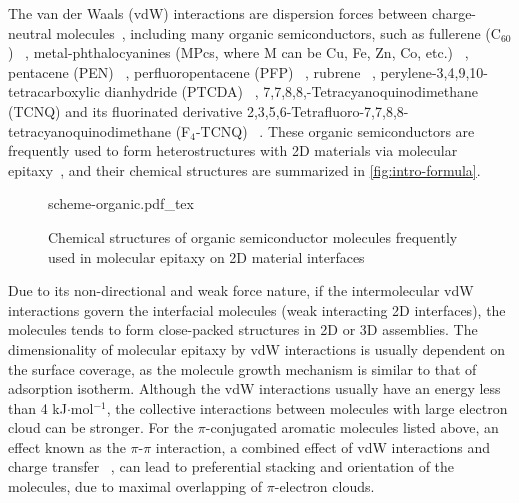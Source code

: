 The van der Waals (vdW) interactions are dispersion forces between
charge-neutral molecules~\cite{Israelachvili_2011_book}, including
many organic semiconductors, such as fullerene (C\(_{\text{60}}\))
~\cite{Corso_2004_C60_hBN,Kim_2015_c60_gr,Chen_2016_c60_mos2},
metal-phthalo\-cyanines (MPcs, where M can be Cu, Fe, Zn, Co, etc.)
~\cite{Xiao_2013_jacs_CuPc_gr,Wang_2010_selec_F16_gr,Zhang_2011_FePc_gr,Hamalainen_2012_CoPc_gr_Ir,Ying_Mao_2011_ge_clAlPc,Ogawa_2013_AlCiPc_gr,Pak_2015_CuPc_MoS2,Avvisati_2017_FePc_intercal,Iannuzzi_2014_MPc_hBN_Rh},
pentacene (PEN)
~\cite{Lee_2011_pentacene,Jariwala_2016_Mos2_pentacene,Shen_2017_DFT_mos2_pent,Kim_2016_trap_Mos2_pent,Nguyen_2015_pent_gr_wett,Betti_2007_orien_pentacene},
perfluoropentacene (PFP)
~\cite{Salzmann_2012_fpen_gr,Breuer_2016_acnene_mos2}, rubrene
~\cite{Lee_2014_rubene_hBN}, perylene-3,4,9,10-tetra\-carboxylic
dianhydride (PTCDA)
~\cite{Wang_2009_STM_PTCDA_Gr,Tian_2010_PTCDA_gr,Huang_2009_PTCDA_gr,Meissner_2012_PTCDA_BLG},
7,7,8,8,-Tetra\-cyanoquino\-dimethane (TCNQ) and its fluorinated
derivative 2,3,5,6-Tetra\-fluoro-7,7,8,8-tetra\-cyanoquino\-dimethane
(F\(_{\text{4}}\)-TCNQ)
~\cite{Chen_2007_TCNQ_gr,Hong_2013_ftcnq_gr,Stradi_2014_TCNQ_gr_Ru,Tsai_2015_TCNQ_gr_hbn}. These
organic semiconductors are frequently used to form heterostructures
with 2D materials via molecular epitaxy~\cite{Hara_1989_ME}, and their chemical structures are summarized in \autoref{fig:intro-formula}.

\begin{figure}[h]
  \centering
  {scheme-organic.pdf_tex}
  \caption{%
    \label{fig:intro-formula}
    Chemical structures of organic semiconductor molecules frequently
    used in molecular epitaxy on 2D material interfaces }
\end{figure}

Due to its non-directional and weak force nature, if the
intermolecular vdW interactions govern the interfacial molecules (weak
interacting 2D interfaces), the molecules tends to form close-packed
structures in 2D or 3D assemblies. The dimensionality of molecular
epitaxy by vdW interactions is usually dependent on the surface
coverage, as the molecule growth mechanism is similar to that of
adsorption isotherm. Although the vdW interactions usually have an
energy less than 4 kJ\(\cdot\)mol\(^{-1}\), the collective
interactions between molecules with large electron cloud can be
stronger. For the \(\pi\)-conjugated aromatic molecules listed above,
an effect known as the \(\pi\)-\(\pi\) interaction, a combined effect
of vdW interactions and charge transfer ~\cite{Hunter_1990_pi,Ortmann_2005_long_range}, can
lead to preferential stacking and orientation of the molecules, due to
maximal overlapping of \(\pi\)-electron clouds.


